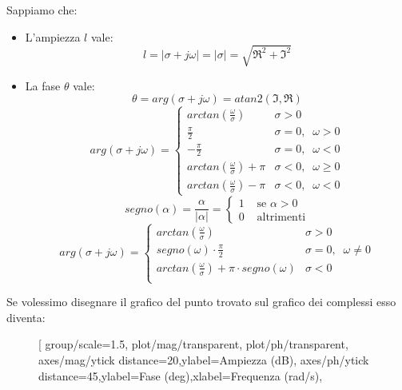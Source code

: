 \documentclass[a4paper]{article}
\begin{document}
\begin{example}
\begin{figure}[H]
  \end{figure}
  Sappiamo che:
  \begin{itemize}
    \item L'ampiezza \( l \) vale:
      \[
        l =  \left| \sigma + j \omega \right| = \left| \sigma  \right| = \sqrt{\Re^2 + \Im^2} 
      \] 
    \item La fase \( \theta \) vale:
      \[
        \theta = arg(\sigma + j \omega) = atan2(\Im, \Re)
      \]
      \[
      arg(\sigma + j \omega) =
      \begin{cases}
        arctan\left( \frac{\omega}{\sigma } \right) & \sigma > 0\\
        \frac{\pi }{2} & \sigma  = 0,\;\; \omega > 0\\
        -\frac{\pi }{2} & \sigma  = 0,\;\; \omega < 0\\
        arctan\left( \frac{\omega}{\sigma } \right) + \pi & \sigma < 0,\;\; \omega \ge 0\\
        arctan\left( \frac{\omega}{\sigma } \right) - \pi & \sigma < 0,\;\; \omega < 0
      \end{cases}
      \] 
      \[
        segno(\alpha) = \frac{\alpha}{|\alpha|} = \begin{cases}
          1 & \text{ se } \alpha > 0\\
          0 & \text{ altrimenti}
        \end{cases}
      \] 
      \[
      arg(\sigma + j \omega) =
      \begin{cases}
        arctan\left( \frac{\omega}{\sigma } \right) & \sigma > 0\\
        segno(\omega) \cdot \frac{\pi}{2} & \sigma = 0,\;\; \omega \neq 0\\
        arctan\left( \frac{\omega}{\sigma } \right) + \pi \cdot segno(\omega) & \sigma < 0\\
      \end{cases}
      \] 
  \end{itemize}
  Se volessimo disegnare il grafico del punto trovato sul grafico dei complessi
  esso diventa:
  \begin{figure}[H]
    \centering
    \BodeZPK[%
    group/scale=1.5,
    plot/mag/{transparent},
    plot/ph/{transparent},
    axes/mag/{ytick distance=20,ylabel={Ampiezza (dB)}},
    axes/ph/{ytick distance=45,ylabel={Fase (deg)},xlabel={Frequenza (rad/s)}},

\end{figure}
\end{example}
\end{document}
